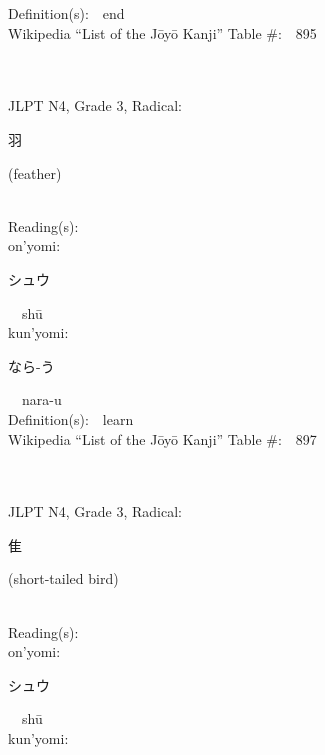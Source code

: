 \begin{multicols}{2}
Definition(s):\ \ end \\
Wikipedia ``List of the J\=oy\=o Kanji'' Table \#:\ \ 895 \\
\ \ \\
{\fontsize{34pt}{40pt}  }\ \ \\  %
{JLPT N4, Grade 3, Radical:\ \ {\begin{CJK}{UTF8}{min} 羽 \end{CJK}} (feather) } \\
Reading(s):\ \ \\
{\hspace*{1em}}on'yomi:\ \ \\
{\hspace*{2em}}{\begin{CJK}{UTF8}{min} シュウ \end{CJK}}\ \ sh\=u\ \ \\
{\hspace*{1em}}kun'yomi:\ \ \\
{\hspace*{2em}}{\begin{CJK}{UTF8}{min} なら-う \end{CJK}}\ \ nara-u\ \ \\
Definition(s):\ \ learn \\
Wikipedia ``List of the J\=oy\=o Kanji'' Table \#:\ \ 897 \\
\ \ \\
{\fontsize{34pt}{40pt}  }\ \ \\  %
{JLPT N4, Grade 3, Radical:\ \ {\begin{CJK}{UTF8}{min} 隹 \end{CJK}} (short-tailed bird) } \\
Reading(s):\ \ \\
{\hspace*{1em}}on'yomi:\ \ \\
{\hspace*{2em}}{\begin{CJK}{UTF8}{min} シュウ \end{CJK}}\ \ sh\=u\ \ \\
{\hspace*{1em}}kun'yomi:\ \ \\

\end{multicols}
